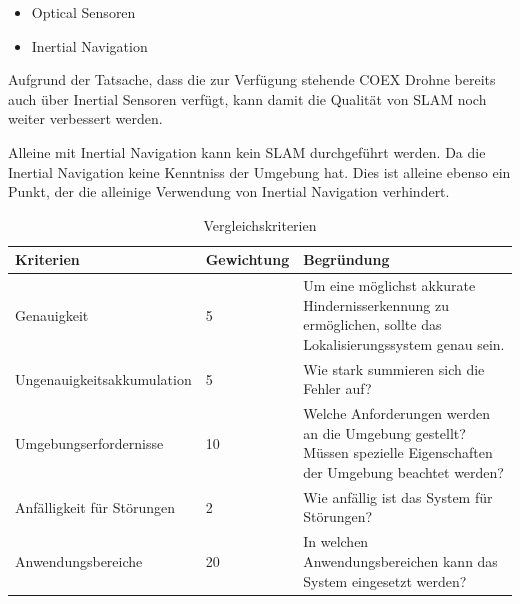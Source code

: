 \begin{itemize}
    \item Optical Sensoren
    \item Inertial Navigation
\end{itemize}

Aufgrund der Tatsache, dass die zur Verfügung stehende COEX Drohne bereits auch über Inertial Sensoren verfügt, kann damit die Qualität von \ac{SLAM} noch weiter verbessert werden.

Alleine mit Inertial Navigation kann kein \ac{SLAM} durchgeführt werden. Da die Inertial Navigation keine Kenntniss der Umgebung hat. Dies ist alleine ebenso ein Punkt, der die alleinige Verwendung von Inertial Navigation verhindert.

\begin{table}[H]
    \centering
    \begin{tabular}{|p{5cm}|p{5cm}|p{5cm}|}
        \hline
        \textbf{Kriterien} & \textbf{Gewichtung} & \textbf{Begründung} \\
        \hline
        Genauigkeit & 5 & Um eine möglichst akkurate Hindernisserkennung zu ermöglichen, sollte das Lokalisierungssystem genau sein. \\
        \hline
        Ungenauigkeitsakkumulation & 5 & Wie stark summieren sich die Fehler auf? \\
        \hline
        Umgebungserfordernisse & 10 & Welche Anforderungen werden an die Umgebung gestellt? Müssen spezielle Eigenschaften der Umgebung beachtet werden? \\
        \hline
        Anfälligkeit für Störungen & 2 & Wie anfällig ist das System für Störungen? \\
        \hline
        Anwendungsbereiche & 20 & In welchen Anwendungsbereichen kann das System eingesetzt werden? \\
        \hline
    \end{tabular}
    \caption{Vergleichskriterien}
    \label{tab:vergleich-kriterien}
\end{table}

